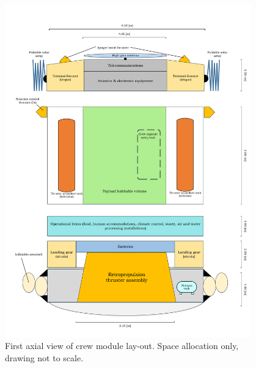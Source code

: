 \begin{figure}[h]
		\centering
		\includegraphics[width=0.95\textwidth]{./Figure/CrewModule/Axialview.pdf}
		\caption[First axial view of crew module lay-out]{First axial view of crew module lay-out. Space allocation only, drawing not to scale.}
		\label{fig:axview}
\end{figure}

